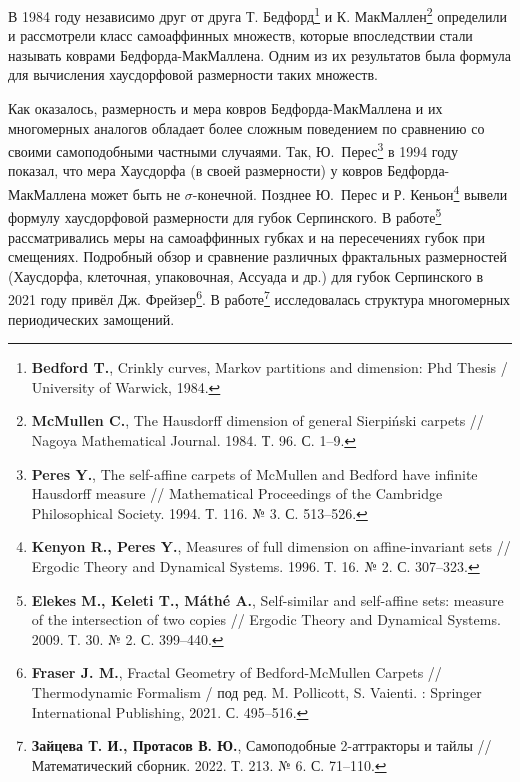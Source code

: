 \documentclass[a5paper,9pt,twoside]{extarticle} %
\begin{document}
В 1984 году независимо друг от друга Т. Бедфорд\footnote{{\bf Bedford T.}, Crinkly curves, Markov partitions and dimension: Phd Thesis / University of Warwick, 1984.} и К. МакМаллен\footnote{{\bf McMullen C.}, The Hausdorff dimension of general Sierpiński carpets // Nagoya Mathematical Journal. 1984. Т. 96. С. 1–9.} определили и рассмотрели класс самоаффинных множеств, которые впоследствии стали называть коврами \linebreak Бедфорда-МакМаллена.
Одним из их результатов была формула для вычисления хаусдорфовой размерности   таких множеств.

Как оказалось, размерность и мера ковров Бедфорда-\linebreak МакМаллена и их многомерных аналогов обладает более сложным поведением по сравнению со своими самоподобными частными случаями.
Так, Ю.~Перес\footnote{{\bf Peres Y.}, The self-affine carpets of McMullen and Bedford have infinite Hausdorff measure // Mathematical Proceedings of the Cambridge Philosophical Society. 1994. Т. 116. № 3. С. 513--526.} в 1994 году показал, что мера Хаусдорфа (в своей размерности) у ковров Бедфорда-МакМал\-ле\-на может быть не $\sigma$-конечной.
Позднее Ю.~Перес и  Р. Кеньон\footnote{{\bf Kenyon R., Peres Y.}, Measures of full dimension on affine-invariant sets // Ergodic Theory and Dynamical Systems. 1996. Т. 16. № 2. С. 307--323.} вывели формулу хаусдорфовой размерности   для губок Серпинского.
В работе\footnote{{\bf Elekes M., Keleti T., Máthé A.}, Self-similar and self-affine sets: measure of the intersection of two copies // Ergodic Theory and Dynamical Systems. 2009. Т. 30. № 2. С. 399--440.} рассматривались меры на самоаффинных губках и на пересечениях губок при смещениях.
Подробный обзор и сравнение различных фрактальных размерностей (Хаусдорфа, клеточная, упаковочная, Ассуада и др.) для губок Серпинского в 2021 году привёл Дж. Фрейзер\footnote{{\bf Fraser J. M.}, Fractal Geometry of Bedford-McMullen Carpets // Thermodynamic Formalism / под ред. M. Pollicott, S. Vaienti. : Springer International Publishing, 2021. С. 495--516.}.
В работе\footnote{{\bf Зайцева Т. И., Протасов В. Ю.}, Самоподобные 2-аттракторы и тайлы // Математический сборник. 2022. Т. 213. № 6. С. 71--110.} исследовалась структура многомерных периодических замощений. 
\end{document}
